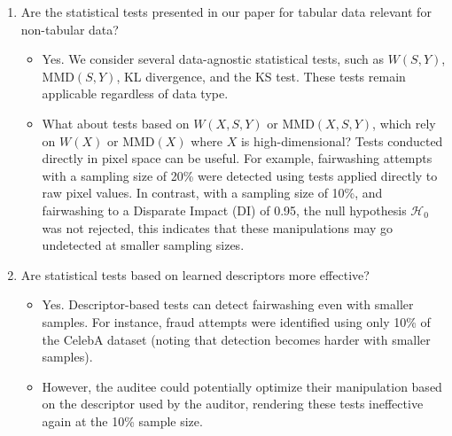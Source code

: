 \documentclass[runningheads, orivec]{llncs}
\begin{document}
\begin{enumerate}
    \item Are the statistical tests presented in our paper for tabular data relevant for non-tabular data?
    \begin{itemize}
        \item Yes. We consider several data-agnostic statistical tests, such as $W(S,Y)$, $\text{MMD}(S,Y)$, KL divergence, and the KS test. These tests remain applicable regardless of data type.
        \item What about tests based on $W(X,S,Y)$ or $\text{MMD}(X,S,Y)$, which rely on $W(X)$ or $\text{MMD}(X)$ where $X$ is high-dimensional?
        Tests conducted directly in pixel space can be useful. For example, fairwashing attempts with a sampling size of 20\% were detected using tests applied directly to raw pixel values. In contrast, with a sampling size of 10\%, and fairwashing to a Disparate Impact (DI) of 0.95, the null hypothesis $\mathcal{H}_0$ was not rejected, this indicates that these manipulations may go undetected at smaller sampling sizes.
    \end{itemize}

    \item Are statistical tests based on learned descriptors more effective?
    \begin{itemize}
        \item Yes. Descriptor-based tests can detect fairwashing even with smaller samples. For instance, fraud attempts were identified using only 10\% of the CelebA dataset (noting that detection becomes harder with smaller samples).
        \item However, the auditee could potentially optimize their manipulation based on the descriptor used by the auditor, rendering these tests ineffective again at the 10\% sample size.
    \end{itemize}


\end{enumerate}
\end{document}
